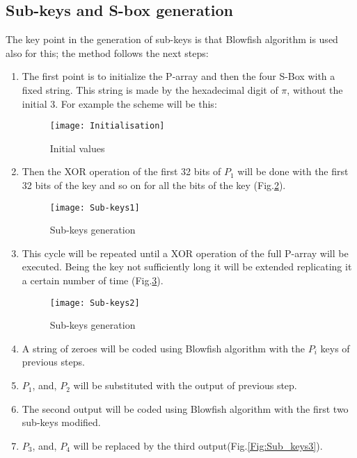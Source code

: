 \subsection{Sub-keys and S-box generation}
The key point in the generation of sub-keys is that Blowfish algorithm is used also for this; the method follows the next steps:
\begin{enumerate}
\item The first point is to initialize the P-array and then the four S-Box with a fixed string. This string is made by the hexadecimal digit of $\pi$, without the initial 3. For example the scheme will be this:
 \vspace{-6mm}
 \begin{figure}[!h]
 \centering
 \texttt{[image: Initialisation]}
 \caption{Initial values}
 \label{Fig:Initialisation}
 \end{figure}
  \vspace{-6mm}
 \item Then the XOR operation of the first 32 bits of $P_1$ will be done with the first 32 bits of the key and so on for all the bits of the key (Fig.\ref{Fig:Sub-keys1}).  
 \begin{figure}[!h]
 \centering
 \texttt{[image: Sub-keys1]}
 \caption{Sub-keys generation}
 \label{Fig:Sub-keys1}
 \end{figure}
 \vspace{-6mm}
 \item This cycle will be repeated until a XOR operation of the full P-array will be executed. Being the key not sufficiently long it will be extended replicating it a certain number of time (Fig.\ref{Fig:Sub_keys2}).
 \vspace{-2mm}
 \begin{figure}[!h]
 \begin{center}
 \texttt{[image: Sub-keys2]}
 \caption{Sub-keys generation}
 \label{Fig:Sub_keys2}
 \end{center}

 \end{figure}
 
  \item A string of zeroes will be coded using Blowfish algorithm with the $P_i$ keys of previous steps.
\item  $P_1$, and, $P_2$ will be substituted with the output of previous step.
\item The second output will be coded using Blowfish algorithm with the first two sub-keys modified.
\item $P_3$, and, $P_4$ will be replaced by the third output(Fig.\ref{Fig:Sub_keys3}).


\end{enumerate}
